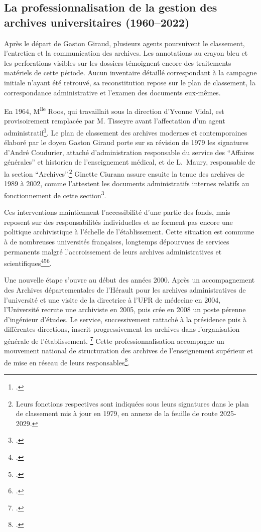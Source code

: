 \subsection{La professionnalisation de la gestion des archives universitaires (1960--2022)}

Après le départ de Gaston Giraud, plusieurs agents poursuivent le classement, l'entretien et la communication des archives. Les annotations au crayon bleu et les perforations visibles sur les dossiers témoignent encore des traitements matériels de cette période. Aucun inventaire détaillé correspondant à la campagne initiale n'ayant été retrouvé, sa reconstitution repose sur le plan de classement, la correspondance administrative et l'examen des documents eux-mêmes.

En 1964, M\textsuperscript{lle} Roos, qui travaillait sous la direction d'Yvonne Vidal, est provisoirement remplacée par M. Tisseyre avant l'affectation d'un agent administratif\footcite{AHFM1MED208}. Le plan de classement des archives modernes et contemporaines élaboré par le doyen Gaston Giraud porte sur sa révision de 1979 les signatures d'André Coudurier, attaché d'administration responsable du service des \enquote{Affaires générales} et historien de l'enseignement médical, et de L.~Maury, responsable de la section \enquote{Archives}.\footnote{Leurs fonctions respectives sont indiquées sous leurs signatures dans le plan de classement mis à jour en 1979, en annexe de la feuille de route 2025-2029.} Ginette Ciurana assure ensuite la tenue des archives de 1989 à 2002, comme l'attestent les documents administratifs internes relatifs au fonctionnement de cette section\footcite{AHFMFeuilleRoute2025_2029}.

Ces interventions maintiennent l'accessibilité d'une partie des fonds, mais reposent sur des responsabilités individuelles et ne forment pas encore une politique archivistique à l'échelle de l'établissement. Cette situation est commune à de nombreuses universités françaises, longtemps dépourvues de services permanents malgré l'accroissement de leurs archives administratives et scientifiques\footcite{Maday2013}\footcite{Mercier2014}\footcite{GazetteArchivesESR2013}.

Une nouvelle étape s'ouvre au début des années 2000. Après un accompagnement des Archives départementales de l'Hérault pour les archives administratives de l'université et une visite de la directrice à l'UFR de médecine en 2004, l'Université recrute une archiviste en 2005, puis crée en 2008 un poste pérenne d'ingénieur d'études. Le service, successivement rattaché à la présidence puis à différentes directions, inscrit progressivement les archives dans l'organisation générale de l'établissement. \footcite{AHFMFeuilleRoute2025_2029} Cette professionnalisation accompagne un mouvement national de structuration des archives de l'enseignement supérieur et de mise en réseau de leurs responsables\footcite{Valencia2023}.

